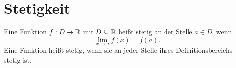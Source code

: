 \chapter{Stetigkeit}

\begin{definition}[Stetigkeit]
  Eine Funktion $f: D \to \mathbb{R}$ mit $D \subseteq \mathbb{R}$ heißt stetig an der Stelle $a \in D$, wenn
  \[
    \lim_{x \to a} f(x) = f(a).
  \]
  Eine Funktion heißt stetig, wenn sie an jeder Stelle ihres Definitionsbereichs stetig ist.
\end{definition}